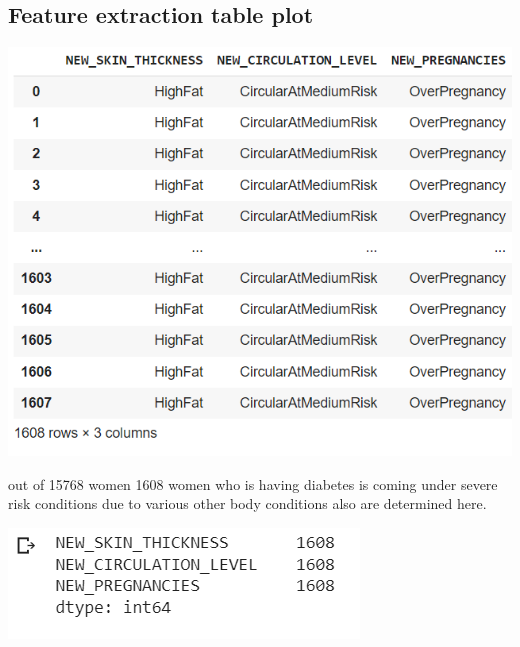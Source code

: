 \documentclass[journal,twoside,web]{ieeecolor}
\begin{document}
\subsection{Feature extraction table plot}
\includegraphics[scale=0.6]{feature extraction.png}

out of 15768 women 1608 women who is having diabetes is coming under severe risk conditions due to various other body conditions also are determined here.

\includegraphics[scale=0.75]{extracted count.png}
\end{document}
